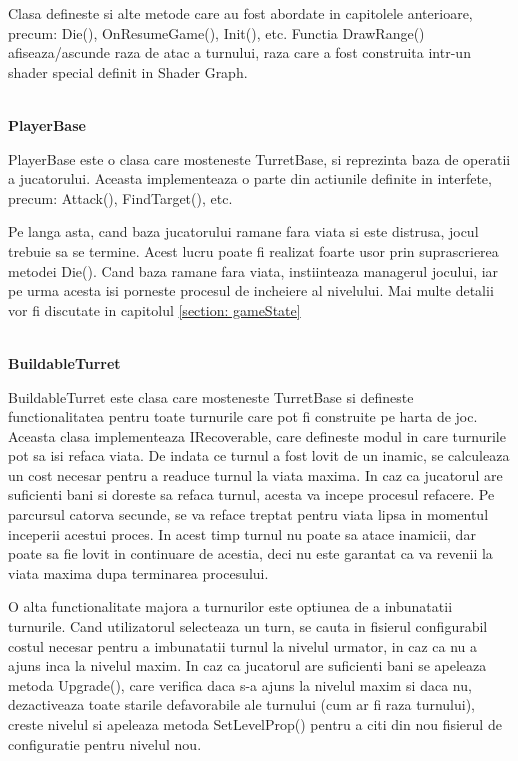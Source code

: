 \documentclass[12pt, a4paper]{article}
\begin{document}
	Clasa defineste si alte metode care au fost abordate in capitolele anterioare, precum: Die(), OnResumeGame(), Init(), etc. Functia DrawRange() afiseaza/ascunde raza de atac a turnului, raza care a fost construita intr-un shader special definit in Shader Graph.
	
	\ \\
	\textbf{PlayerBase}
	
	PlayerBase este o clasa care mosteneste TurretBase, si reprezinta baza de operatii a jucatorului. Aceasta implementeaza o parte din actiunile definite in interfete, precum: Attack(), FindTarget(), etc.
	
	Pe langa asta, cand baza jucatorului ramane fara viata si este distrusa, jocul trebuie sa se termine. Acest lucru poate fi realizat foarte usor prin suprascrierea metodei Die(). Cand baza ramane fara viata, instiinteaza managerul jocului, iar pe urma acesta isi porneste procesul de incheiere al nivelului. Mai multe detalii vor fi discutate in capitolul \ref{section: gameState}
	
	\ \\
	\textbf{BuildableTurret}
	
	BuildableTurret este clasa care mosteneste TurretBase si defineste functionalitatea pentru toate turnurile care pot fi construite pe harta de joc. Aceasta clasa implementeaza IRecoverable, care defineste modul in care turnurile pot sa isi refaca viata. De indata ce turnul a fost lovit de un inamic, se calculeaza un cost necesar pentru a readuce turnul la viata maxima. In caz ca jucatorul are suficienti bani si doreste sa refaca turnul, acesta va incepe procesul refacere. Pe parcursul catorva secunde, se va reface treptat pentru viata lipsa in momentul inceperii acestui proces. In acest timp turnul nu poate sa atace inamicii, dar poate sa fie lovit in continuare de acestia, deci nu este garantat ca va revenii la viata maxima dupa terminarea procesului.
	
	O alta functionalitate majora a turnurilor este optiunea de a inbunatatii turnurile. Cand utilizatorul selecteaza un turn, se cauta in fisierul configurabil costul necesar pentru a imbunatatii turnul la nivelul urmator, in caz ca nu a ajuns inca la nivelul maxim. In caz ca jucatorul are suficienti bani se apeleaza metoda Upgrade(), care verifica daca s-a ajuns la nivelul maxim si daca nu, dezactiveaza toate starile defavorabile ale turnului (cum ar fi raza turnului), creste nivelul si apeleaza metoda SetLevelProp() pentru a citi din nou fisierul de configuratie pentru nivelul nou.
	
\end{document}

